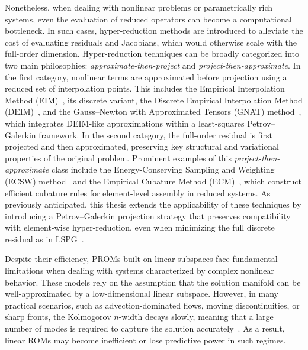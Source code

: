 Nonetheless, when dealing with nonlinear problems or parametrically rich systems, even the evaluation of reduced operators can become a computational bottleneck. In such cases, hyper-reduction methods are introduced to alleviate the cost of evaluating residuals and Jacobians, which would otherwise scale with the full-order dimension. Hyper-reduction techniques can be broadly categorized into two main philosophies: \textit{approximate-then-project} and \textit{project-then-approximate}. In the first category, nonlinear terms are approximated before projection using a reduced set of interpolation points. This includes the Empirical Interpolation Method (EIM)~\cite{barrault2004empirical}, its discrete variant, the Discrete Empirical Interpolation Method (DEIM)~\cite{chaturantabut2010nonlinear}, and the Gauss–Newton with Approximated Tensors (GNAT) method~\cite{Carlberg2013}, which integrates DEIM-like approximations within a least-squares Petrov–Galerkin framework. In the second category, the full-order residual is first projected and then approximated, preserving key structural and variational properties of the original problem. Prominent examples of this \textit{project-then-approximate} class include the Energy-Conserving Sampling and Weighting (ECSW) method~\cite{Farhat2015, grimberg2021mesh} and the Empirical Cubature Method (ECM)~\cite{hernandez2017dimensional, hernandez2020multiscale, Hernandez2024}, which construct efficient cubature rules for element-level assembly in reduced systems. As previously anticipated, this thesis extends the applicability of these techniques by introducing a Petrov–Galerkin projection strategy that preserves compatibility with element-wise hyper-reduction, even when minimizing the full discrete residual as in LSPG~\cite{Ares2023}.

Despite their efficiency, PROMs built on linear subspaces face fundamental limitations when dealing with systems characterized by complex nonlinear behavior. These models rely on the assumption that the solution manifold can be well-approximated by a low-dimensional linear subspace. However, in many practical scenarios, such as advection-dominated flows, moving discontinuities, or sharp fronts, the Kolmogorov $n$-width decays slowly, meaning that a large number of modes is required to capture the solution accurately~\cite{ohlberger2015reduced, peherstorfer2020model, ohlberger2013nonlinear, dahmen2014double, taddei2015reduced}. As a result, linear ROMs may become inefficient or lose predictive power in such regimes.


